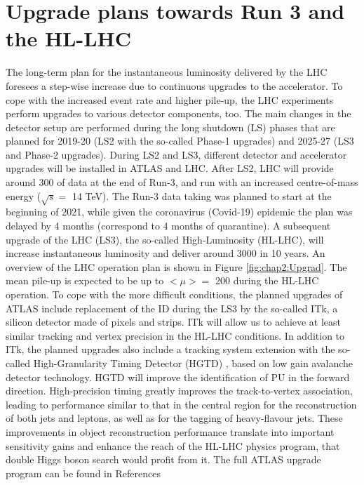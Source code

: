\section{Upgrade plans towards Run 3 and the HL-LHC}
\label{chap2:Upgrad}
The long-term plan for the instantaneous luminosity delivered by the LHC foresees a step-wise increase due to continuous upgrades to the accelerator. To cope with the increased event rate and higher pile-up, the LHC experiments perform upgrades to various detector components, too. The main changes in the detector setup are performed during the long shutdown (LS) phases that are planned for 2019-20 (LS2 with the so-called Phase-1 upgrades) and 2025-27 (LS3 and Phase-2 upgrades). During LS2 and LS3, different detector and accelerator upgrades will be installed in ATLAS and LHC. After LS2, LHC will provide around 300 \ifb of data at the end of Run-3, and run with an increased centre-of-mass energy ($\sqrt{s} = $ 14 TeV). The Run-3 data taking was planned to start at the beginning of 2021, while given the coronavirus (Covid-19) epidemic the plan was delayed by 4 months (correspond to 4 months of quarantine).  A subsequent upgrade of the LHC (LS3), the so-called High-Luminosity (HL-LHC), will increase instantaneous luminosity and deliver around 3000 \ifb in 10 years.  An overview of the LHC operation plan is shown in Figure \ref{fig:chap2:Upgrad}. The mean pile-up is expected to be up to  $<\mu> = $ 200 during the HL-LHC operation. To cope with the more difficult conditions, the planned upgrades of ATLAS include replacement of the ID during the LS3 by the so-called ITk, a silicon detector made of pixels and strips. ITk will allow us to achieve at least similar tracking and vertex precision in the HL-LHC conditions. In addition to ITk, the planned upgrades also include a tracking system extension with the so-called High-Granularity Timing Detector (HGTD) \cite{HGTD}, based on low gain avalanche detector technology. HGTD will improve the identification of PU in the forward direction.  High-precision timing greatly improves the track-to-vertex association, leading to performance similar to that in the central region for the reconstruction of both jets and leptons, as well as for the tagging of heavy-flavour jets. These improvements in object reconstruction performance translate into important sensitivity gains and enhance the reach of the HL-LHC physics program, that double Higgs boson search would profit from it. The full ATLAS upgrade program can be found in References \cite{CERN-LHCC-2015-020, CERN-LHCC-2017-021, CERN-LHCC-2017-020, CERN-LHCC-2017-005, CERN-LHCC-2017-017, CERN-LHCC-2017-018, CERN-LHCC-2017-019}

